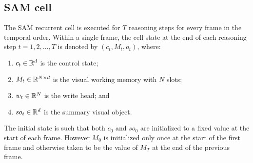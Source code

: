 \hrulefill

\subsection{SAM cell}

The SAM recurrent cell is executed for $T$ reasoning steps for every frame in
the temporal order.  Within a single frame, the cell state at the end of each reasoning step 
$t=1,2, \dots, T$ is denoted by $(c_t, M_t, o_t)$, where: 
\begin{enumerate}
	\item $c_t \in \mathbb{R}^d$ is the control state;
	\item $M_t \in  \mathbb{R}^{N \times d}$ is the visual working memory with $N$ slots;
	\item $w_t \in  \mathbb{R}^N$ is the write head; and
	\item $so_t  \in \mathbb{R}^d$ is the summary visual object.
\end{enumerate} 
The initial state is such that both $c_0$ and $so_0$ are initialized
to a fixed value at the start of each frame. However $M_0$ is initialized only once at
the start of the first frame and otherwise taken to be the value of $M_T$ at the
end of the previous frame.



%

